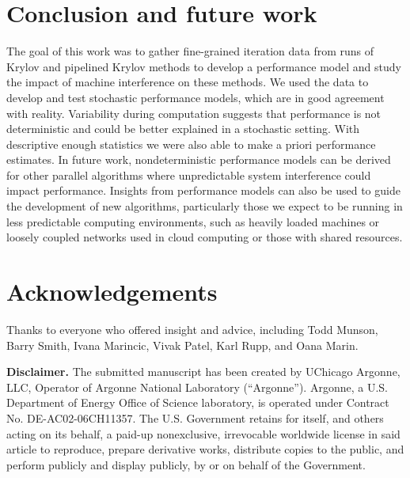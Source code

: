 \documentclass[num-refs]{wiley-article}
\begin{document}
\section{Conclusion and future work} \label{sec:conclusion}

The goal of this work was to gather fine-grained iteration data from runs of Krylov and pipelined Krylov methods to develop a performance model and study the impact of machine interference on these methods. 
We used the data to develop and test stochastic performance models, which are in good agreement with reality. 
Variability during computation suggests that performance is not deterministic and could be better explained in a stochastic setting. 
With descriptive enough statistics we were also able to make a priori performance estimates. 
In future work, nondeterministic performance models can be derived for other parallel algorithms where unpredictable system interference could impact performance.
Insights from performance models can also be used to guide the development of new algorithms, particularly those we expect to be running in less predictable computing environments, such as heavily loaded machines or loosely coupled networks used in cloud computing or those with shared resources.

\section*{Acknowledgements}
Thanks to everyone who offered insight and advice, including Todd Munson, Barry Smith, Ivana Marincic, Vivak Patel, Karl Rupp, and Oana Marin.



\newpage
{\bf Disclaimer.} The submitted manuscript has been created by UChicago Argonne, LLC,
Operator of Argonne National Laboratory (``Argonne'').
Argonne, a U.S. Department of Energy Office of Science laboratory, is
operated under Contract No. DE-AC02-06CH11357. The U.S. Government
retains for itself, and others acting on its behalf, a paid-up
nonexclusive, irrevocable worldwide license in said article to reproduce,
prepare derivative works, distribute copies to the public, and perform
publicly and display publicly, by or on behalf of the Government.
\end{document}
